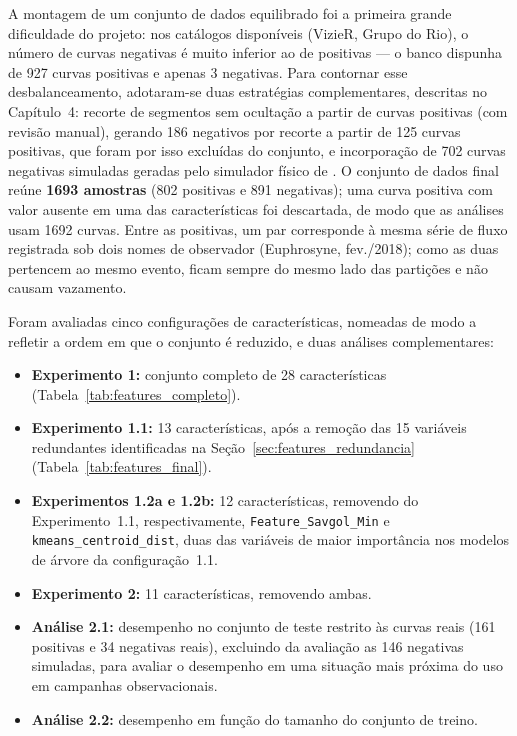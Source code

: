 A montagem de um conjunto de dados equilibrado foi a primeira grande dificuldade do projeto: nos catálogos disponíveis (VizieR, Grupo do Rio), o número de curvas negativas é muito inferior ao de positivas --- o banco dispunha de 927 curvas positivas e apenas 3 negativas. Para contornar esse desbalanceamento, adotaram-se duas estratégias complementares, descritas no Capítulo~4: recorte de segmentos sem ocultação a partir de curvas positivas (com revisão manual), gerando 186 negativos por recorte a partir de 125 curvas positivas, que foram por isso excluídas do conjunto, e incorporação de 702 curvas negativas simuladas geradas pelo simulador físico de \citet{Simulator}. O conjunto de dados final reúne \textbf{1693 amostras} (802 positivas e 891 negativas); uma curva positiva com valor ausente em uma das características foi descartada, de modo que as análises usam 1692 curvas. Entre as positivas, um par corresponde à mesma série de fluxo registrada sob dois nomes de observador (Euphrosyne, fev./2018); como as duas pertencem ao mesmo evento, ficam sempre do mesmo lado das partições e não causam vazamento.

Foram avaliadas cinco configurações de características, nomeadas de modo a refletir a ordem em que o conjunto é reduzido, e duas análises complementares:

\begin{itemize}
	\item \textbf{Experimento 1:} conjunto completo de 28 características (Tabela~\ref{tab:features_completo}).
	\item \textbf{Experimento 1.1:} 13 características, após a remoção das 15 variáveis redundantes identificadas na Seção~\ref{sec:features_redundancia} (Tabela~\ref{tab:features_final}).
	\item \textbf{Experimentos 1.2a e 1.2b:} 12 características, removendo do Experimento~1.1, respectivamente, \texttt{Feature\_Savgol\_Min} e \texttt{kmeans\_centroid\_dist}, duas das variáveis de maior importância nos modelos de árvore da configuração~1.1.
	\item \textbf{Experimento 2:} 11 características, removendo ambas.
	\item \textbf{Análise 2.1:} desempenho no conjunto de teste restrito às curvas reais (161 positivas e 34 negativas reais), excluindo da avaliação as 146 negativas simuladas, para avaliar o desempenho em uma situação mais próxima do uso em campanhas observacionais.
	\item \textbf{Análise 2.2:} desempenho em função do tamanho do conjunto de treino.
\end{itemize}

